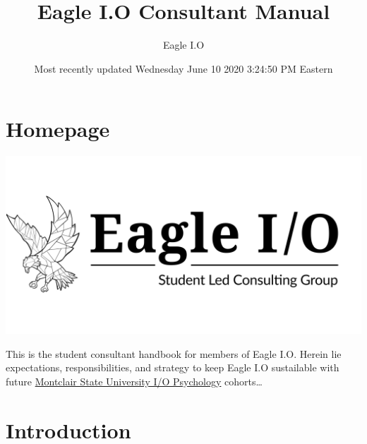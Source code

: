 \documentclass[
]{book}
\title{Eagle I.O Consultant Manual}
\author{Eagle I.O}
\date{Most recently updated Wednesday June 10 2020 3:24:50 PM Eastern}
\begin{document}
\maketitle

{
\setcounter{tocdepth}{1}
\tableofcontents
}
\hypertarget{homepage}{%
\chapter*{Homepage}\label{homepage}}

\includegraphics{images/eagleio.PNG}

This is the student consultant handbook for members of Eagle I.O. Herein lie expectations, responsibilities, and strategy to keep Eagle I.O sustailable with future \href{https://www.montclair.edu/psychology/graduate-programs/industrial-organizational-psychology/}{Montclair State University I/O Psychology} cohorts\ldots{}

\hypertarget{introduction}{%
\chapter{Introduction}\label{introduction}}
\end{document}
